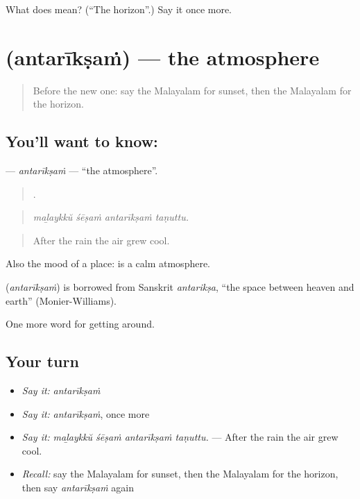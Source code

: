 \begin{tcolorbox}[breakable,colback=teal!4,colframe=teal!35!black,title={Before you move on}]
What does  mean? (\textquotedblleft{}The horizon\textquotedblright{}.) Say it once more.
\end{tcolorbox}
\section[\texorpdfstring{\ml{അന്തരീക്ഷം} (antarīkṣaṁ)}{അന്തരീക്ഷം (antarīkṣaṁ)}]{ (antarīkṣaṁ) — the atmosphere}

\label{lesson:ML-C506-antariksam}



\begin{quote}
Before the new one: say the Malayalam for sunset, then the Malayalam for the horizon.
\end{quote}

\subsection*{You'll want to know: }
\textbf{} — \emph{antarīkṣaṁ} — \textquotedblleft{}the atmosphere\textquotedblright{}.

\begin{quote}
   .
\end{quote}

\begin{quote}
\emph{maḻaykkŭ śēṣaṁ antarīkṣaṁ taṇuttu.}
\end{quote}

\begin{quote}
After the rain the air grew cool.
\end{quote}

Also the mood of a place:   is a calm atmosphere.

\begin{cousinweb}
\textbf{} (\emph{antarīkṣaṁ}) is borrowed from Sanskrit \emph{antarikṣa}, \textquotedblleft{}the space between heaven and earth\textquotedblright{} (Monier-Williams).
\end{cousinweb}

\begin{grammarlens}[title={What you've built}]
One more word for getting around.
\end{grammarlens}

\subsection*{Your turn}
\begin{itemize}
\raggedright
  \item \emph{Say it:} \emph{antarīkṣaṁ}
  \item \emph{Say it:} \emph{antarīkṣaṁ}, once more
  \item \emph{Say it:} \emph{maḻaykkŭ śēṣaṁ antarīkṣaṁ taṇuttu.} — After the rain the air grew cool.
  \item \emph{Recall:} say the Malayalam for sunset, then the Malayalam for the horizon, then say \emph{antarīkṣaṁ} again
\end{itemize}


